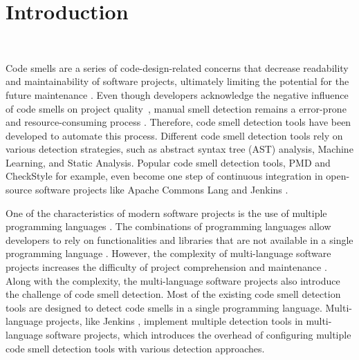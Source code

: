 \section{Introduction}~\label{sec:introduction}


Code smells are a series of code-design-related concerns that decrease
readability \cite{5741260} and maintainability \cite{6392174,6405287} of
software projects, ultimately limiting the potential for the future maintenance
\cite{Fowler_Beck}. Even though developers acknowledge the negative influence
of code smells on project quality~\cite{developersCare}, manual smell detection
remains a error-prone and resource-consuming process
\cite{DetectingDefectsInObject}. Therefore, code smell detection tools have
been developed to automate this process. Different code smell detection tools
rely on various detection strategies, such as abstract syntax tree (AST)
analysis, Machine Learning, and Static Analysis. Popular code smell detection
tools, PMD \cite{PMD} and CheckStyle \cite{CheckStyle} for example, even become
one step of continuous integration in open-source software projects like Apache
Commons Lang \cite{ApacheCommonsLang} and Jenkins \cite{Jekins}.

One of the characteristics of modern software projects is the use of multiple
programming languages \cite{723183}. The combinations of programming languages
allow developers to rely on functionalities and libraries that are not available
in a single programming language \cite{7476675}. However, the complexity of
multi-language software projects increases the difficulty of project
comprehension and maintenance \cite{7476675, 10.1109/SCAM.2012.11, 7396422}.
Along with the complexity, the multi-language software projects also introduce
the challenge of code smell detection. Most of the existing code smell detection
tools are designed to detect code smells in a single programming language.
Multi-language projects, like Jenkins \cite{Jekins}, implement multiple
detection tools in multi-language software projects, which introduces the
overhead of configuring multiple code smell detection tools with various
detection approaches.

